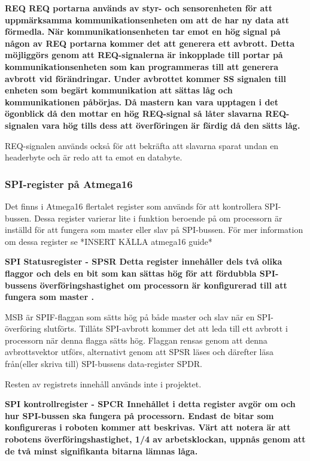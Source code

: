 \bf{REQ}
REQ portarna används av styr- och sensorenheten för att uppmärksamma 
kommunikationsenheten om att de har ny data att förmedla. När 
kommunikationsenheten tar emot en hög signal på någon av REQ portarna kommer 
det att generera ett avbrott. Detta möjliggörs genom att REQ-signalerna är 
inkopplade till portar på kommunikationsenheten som kan programmeras till att 
generera avbrott vid förändringar. Under avbrottet kommer SS signalen till 
enheten som begärt kommunikation att sättas låg och kommunikationen påbörjas. 
Då mastern kan vara upptagen i det ögonblick då den mottar en hög REQ-signal 
så låter slavarna REQ-signalen vara hög tills dess att överföringen är färdig 
då den sätts låg.

REQ-signalen används också för att bekräfta att slavarna sparat undan en 
headerbyte och är redo att ta emot en databyte. 

\subsubsection{SPI-register på Atmega16}

Det finns i Atmega16 flertalet register som används för att kontrollera SPI-
bussen. Dessa register varierar lite i funktion beroende på om processorn är 
inställd för att fungera som master eller slav på SPI-bussen. För mer 
information om dessa register se *INSERT KÄLLA atmega16 guide*

\bf{SPI Statusregister - SPSR}
Detta register innehåller dels två olika flaggor och dels en bit som kan 
sättas hög för att fördubbla SPI-bussens överföringshastighet om processorn 
är konfigurerad till att fungera som master . 

MSB är SPIF-flaggan som sätts hög på både master och slav när en 
SPI- överföring slutförts. Tillåts SPI-avbrott kommer 
det att leda till ett avbrott i processorn när denna flagga sätts hög. 
Flaggan rensas genom att denna avbrottsvektor utförs, alternativt genom att 
SPSR läses och därefter läsa från(eller skriva till) SPI-bussens data-register SPDR.

Resten av registrets innehåll används inte i projektet.

\bf{SPI kontrollregister - SPCR}
Innehållet i detta register avgör om och hur SPI-bussen ska fungera på 
processorn. Endast de bitar som konfigureras i roboten kommer att beskrivas. 
Värt att notera är att robotens överföringshastighet, 1/4 av arbetsklockan, 
uppnås genom att de två minst signifikanta bitarna lämnas låga.

